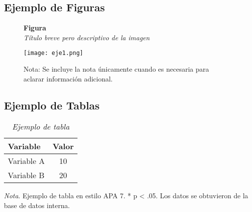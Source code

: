 \documentclass[12pt,letterpaper]{report}
\begin{document}
	\subsection*{Ejemplo de Figuras}
	\begin{figure}[ht]
		
		\textbf{Figura \thefigure}\\[0.5em]
		\textit{Título breve pero descriptivo de la imagen}\\[1em]
		\begin{center}
			
			\texttt{[image: eje1.png]}\\[1em]
		\end{center}
		
		
		\normalsize Nota: Se incluye la nota únicamente cuando es necesaria para aclarar información adicional.
		
	\end{figure}
	\newpage
	\subsection*{Ejemplo de Tablas}
	
	\begin{table}[ht]
		\captionsetup{justification=raggedright,singlelinecheck=false}
		\caption{\textit{Ejemplo de tabla}}
		\label{tab:variables} %
		\centering
		\begin{tabular}{l c}
			\toprule
			\textbf{Variable} & \textbf{Valor} \\
			\midrule
			Variable A        & 10 \\
			Variable B        & 20 \\
			\bottomrule
		\end{tabular}
		
		\begin{flushleft}
			\textit{Nota}. Ejemplo de tabla en estilo APA 7. * p < .05.  
			Los datos se obtuvieron de la base de datos interna.
		\end{flushleft}
	\end{table}
	
\end{document}
